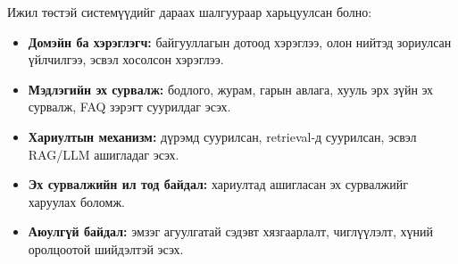 Ижил төстэй системүүдийг дараах шалгуураар харьцуулсан болно:
\begin{itemize}
    \item \textbf{Домэйн ба хэрэглэгч:} байгууллагын дотоод хэрэглээ, олон нийтэд зориулсан үйлчилгээ, эсвэл хосолсон хэрэглээ.
    \item \textbf{Мэдлэгийн эх сурвалж:} бодлого, журам, гарын авлага, хууль эрх зүйн эх сурвалж, FAQ зэрэгт суурилдаг эсэх.
    \item \textbf{Хариултын механизм:} дүрэмд суурилсан, retrieval-д суурилсан, эсвэл RAG/LLM ашигладаг эсэх.
    \item \textbf{Эх сурвалжийн ил тод байдал:} хариултад ашигласан эх сурвалжийг харуулах боломж.
    \item \textbf{Аюулгүй байдал:} эмзэг агуулгатай сэдэвт хязгаарлалт, чиглүүлэлт, хүний оролцоотой шийдэлтэй эсэх.
    
\end{itemize}


